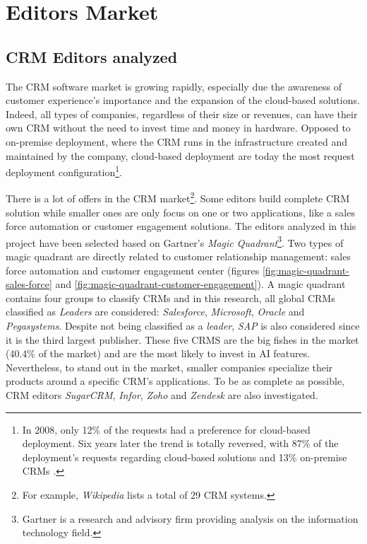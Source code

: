 \section{Editors Market}


\subsection{CRM Editors analyzed}
The CRM software market is growing rapidly, especially due the awareness of customer experience's importance and the expansion of the cloud-based solutions\cite{crm-revenue}. Indeed, all types of companies, regardless of their size or revenues, can have their own CRM without the need to invest time and money in hardware. Opposed to on-premise deployment, where the CRM runs in the infrastructure created and maintained by the company, cloud-based deployment are today the most request deployment configuration\footnote{In 2008, only 12\% of the requests had a preference for cloud-based deployment. Six years later the trend is totally reversed, with 87\% of the deployment's requests regarding cloud-based solutions and 13\% on-premise CRMs \cite{crm-deployment-stats}.}.

There is a lot of offers in the CRM market\footnote{For example, \textit{Wikipedia} lists a total of 29 CRM systems.}. Some editors build complete CRM solution while smaller ones are only focus on one or two applications, like a sales force automation or customer engagement solutions. The editors analyzed in this project have been selected based on Gartner's \textit{Magic Quadrant}\footnote{Gartner is a research and advisory firm providing analysis on the information technology field.}. Two types of magic quadrant are directly related to customer relationship management: sales force automation and customer engagement center (figures \ref{fig:magic-quadrant-sales-force} and \ref{fig:magic-quadrant-customer-engagement}). A magic quadrant contains four groups to classify CRMs and in this research, all global CRMs classified as \textit{Leaders} are considered: \textit{Salesforce}, \textit{Microsoft}, \textit{Oracle} and \textit{Pegasystems}. Despite not being classified as a \textit{leader}, \textit{SAP} is also considered since it is the third largest publisher\cite{crm-market-share}. These five CRMS are the big fishes in the market (40.4\% of the market) and are the most likely to invest in AI features. Nevertheless, to stand out in the market, smaller companies specialize their products around a specific CRM's applications. To be as complete as possible, CRM editors \textit{SugarCRM}, \textit{Infor}, \textit{Zoho} and \textit{Zendesk} are also investigated.


